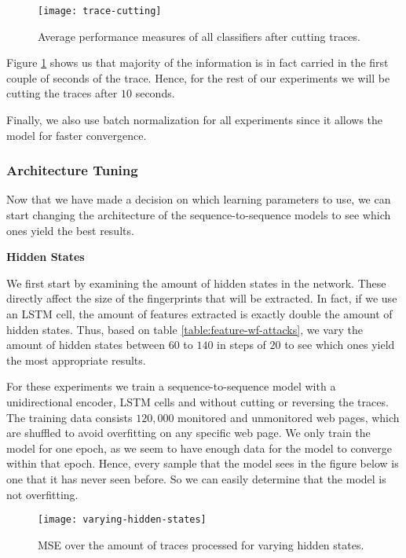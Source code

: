 \begin{figure}[ht]
  \centering
  \texttt{[image: trace-cutting]}
  \caption{Average performance measures of all classifiers after cutting traces.}
  \label{fig:trace-cutting}
\end{figure}

Figure \ref{fig:trace-cutting} shows us that majority of the information is in fact carried in the first couple of seconds of the trace.
Hence, for the rest of our experiments we will be cutting the traces after $10$ seconds.

Finally, we also use batch normalization for all experiments since it allows the model for faster convergence.

\subsubsection{Architecture Tuning}

Now that we have made a decision on which learning parameters to use, we can start changing the architecture of the sequence-to-sequence models to see which ones yield the best results.

\noindent
\textbf{Hidden States}

We first start by examining the amount of hidden states in the network.
These directly affect the size of the fingerprints that will be extracted.
In fact, if we use an LSTM cell, the amount of features extracted is exactly double the amount of hidden states.
Thus, based on table \ref{table:feature-wf-attacks}, we vary the amount of hidden states between $60$ to $140$ in steps of $20$ to see which ones yield the most appropriate results.

For these experiments we train a sequence-to-sequence model with a unidirectional encoder, LSTM cells and without cutting or reversing the traces.
The training data consists $120,000$ monitored and unmonitored web pages, which are shuffled to avoid overfitting on any specific web page.
We only train the model for one epoch, as we seem to have enough data for the model to converge within that epoch.
Hence, every sample that the model sees in the figure below is one that it has never seen before.
So we can easily determine that the model is not overfitting.

\begin{figure}[ht]
  \centering
  \texttt{[image: varying-hidden-states]}
  \caption{MSE over the amount of traces processed for varying hidden states.}
  \label{fig:varying-hidden-states}
\end{figure}

